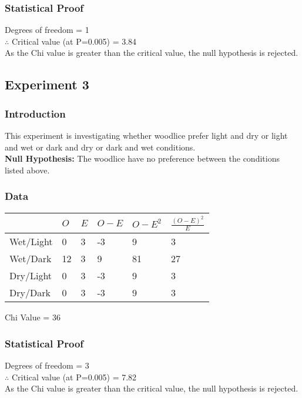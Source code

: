 \documentclass{thomasClass}
\begin{document}
\subsubsection{Statistical Proof}
Degrees of freedom = 1\\
$\therefore$ Critical value (at P=0.005) = 3.84 \\
As the Chi value is greater than the critical value, the null hypothesis is rejected.\\


\subsection{Experiment 3}
\subsubsection{Introduction}
This experiment is investigating whether woodlice prefer light and dry or light and wet or dark and dry or dark and wet conditions.\\
\textbf{Null Hypothesis: }The woodlice have no preference between the conditions listed above.
\subsubsection{Data}
\begin{table}[H]
\begin{tabularx}{0.6\textwidth}{l|XXXXX}
 & $O$ & $E$ & $O-E$ & $O-E^2$ & $\frac{(O-E)^2}{E}$ \\
 \hline
Wet/Light & 0 & 3 & -3 & 9 & 3 \\
Wet/Dark & 12 & 3 & 9 & 81 & 27 \\
Dry/Light & 0 & 3 & -3 & 9 & 3 \\
Dry/Dark & 0 & 3 & -3 & 9 & 3
\end{tabularx}
\end{table}
Chi Value = 36
\subsubsection{Statistical Proof}
Degrees of freedom = 3\\
$\therefore$ Critical value (at P=0.005) = 7.82 \\
As the Chi value is greater than the critical value, the null hypothesis is rejected.
\end{document}
